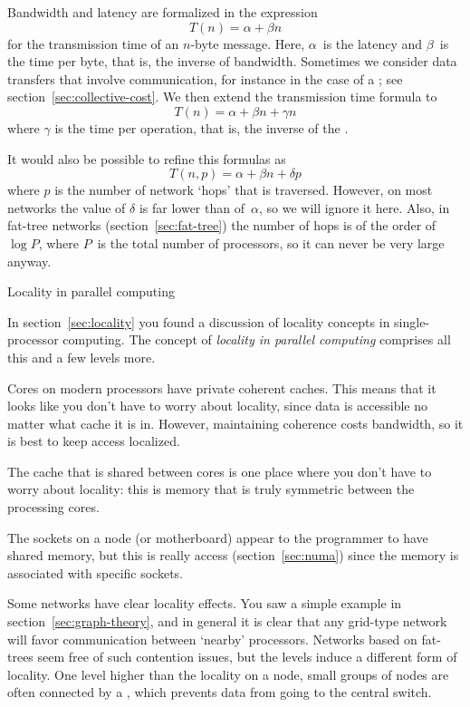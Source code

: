 Bandwidth and latency are formalized in the expression
\[ T(n)=\alpha+\beta n \]
for the transmission time of an $n$-byte message. Here, $\alpha$~is
the latency and $\beta$~is the time per byte, that is, the inverse of
bandwidth. Sometimes we consider data transfers that involve
communication, for instance in the case of a ; see section~\ref{sec:collective-cost}. We then extend
the transmission time formula to
\[ T(n)=\alpha+\beta n+\gamma n \]
where $\gamma$ is the time per operation, that is, the inverse of the
.

It would also be possible to refine this formulas as
\[ T(n,p) = \alpha+\beta n+\delta p \]
where $p$ is the number of network `hops' that is traversed. However,
on most networks the value of $\delta$ is far lower than of~$\alpha$,
so we will ignore it here. Also, in fat-tree networks
(section~\ref{sec:fat-tree}) the number of hops is of the order of
$\log P$, where $P$~is the total number of processors, so it can never
be very large anyway.

 {Locality in parallel computing}
\label{sec:parallel-local}

In section~\ref{sec:locality} you found a discussion of 
locality concepts in single-processor computing.
The concept of \emph{locality in parallel computing}
comprises all this and a few levels more.

 Cores on modern processors have
private coherent caches. This means that
 it looks like you don't have to worry about locality, since data
  is accessible no matter what cache it is in. However, maintaining coherence
  costs bandwidth, so it is best to keep access localized.

 The cache that is shared between cores
is one place where you don't have to worry about locality: this is memory that
is truly symmetric between the processing cores.

 The sockets on a node (or motherboard)
appear to the programmer to have shared memory, but this is really 
 access (section~\ref{sec:numa}) since the memory is
associated with specific sockets.

 Some networks have clear locality effects.
You saw a simple example in section~\ref{sec:graph-theory}, and 
in general it is clear that any grid-type network will favor communication
between `nearby' processors. Networks based on fat-trees seem free of such
contention issues, but the levels induce a different form of locality.
One level higher than the locality on a node, small groups of nodes
are often connected by a , 
which prevents data from going to the central switch.

